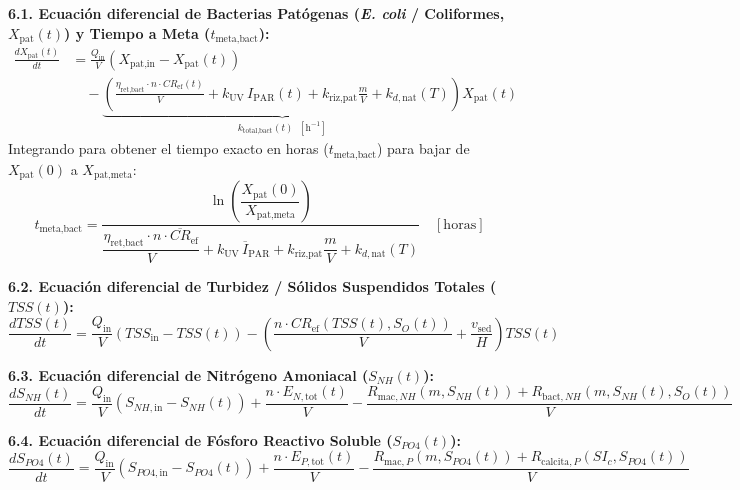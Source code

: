 \documentclass[11pt,letterpaper]{article}
\begin{document}
\begin{formulabox}
\textbf{6.1. Ecuación diferencial de Bacterias Patógenas (\textit{E. coli} / Coliformes, $X_{\text{pat}}(t)$) y Tiempo a Meta ($t_{\text{meta,bact}}$):}
\begin{equation}
\begin{aligned}
\frac{dX_{\text{pat}}(t)}{dt} &= \frac{Q_{\text{in}}}{V}\left(X_{\text{pat,in}} - X_{\text{pat}}(t)\right) \\
&\quad - \underbrace{\left(\frac{\eta_{\text{ret,bact}} \cdot n \cdot CR_{\text{ef}}(t)}{V} + k_{\text{UV}}\,I_{\text{PAR}}(t) + k_{\text{riz,pat}}\frac{m}{V} + k_{d,\text{nat}}(T)\right)}_{k_{\text{total,bact}}(t) \;\; [\text{h}^{-1}]} X_{\text{pat}}(t)
\end{aligned}
\label{eq:dxpat}
\end{equation}
Integrando para obtener el tiempo exacto en horas ($t_{\text{meta,bact}}$) para bajar de $X_{\text{pat}}(0)$ a $X_{\text{pat,meta}}$:
\begin{equation}
t_{\text{meta,bact}} = \frac{\ln\!\left(\dfrac{X_{\text{pat}}(0)}{X_{\text{pat,meta}}}\right)}{\dfrac{\eta_{\text{ret,bact}} \cdot n \cdot \overline{CR}_{\text{ef}}}{V} + k_{\text{UV}}\,\overline{I}_{\text{PAR}} + k_{\text{riz,pat}}\dfrac{m}{V} + k_{d,\text{nat}}(T)} \quad [\text{horas}]
\label{eq:tmetabact}
\end{equation}

\textbf{6.2. Ecuación diferencial de Turbidez / Sólidos Suspendidos Totales ($TSS(t)$):}
\begin{equation}
\frac{dTSS(t)}{dt} = \frac{Q_{\text{in}}}{V}\left(TSS_{\text{in}} - TSS(t)\right) - \left(\frac{n \cdot CR_{\text{ef}}\!\left(TSS(t), S_O(t)\right)}{V} + \frac{v_{\text{sed}}}{H}\right) TSS(t)
\label{eq:dtss}
\end{equation}

\textbf{6.3. Ecuación diferencial de Nitrógeno Amoniacal ($S_{NH}(t)$):}
\begin{equation}
\frac{dS_{NH}(t)}{dt} = \frac{Q_{\text{in}}}{V}\left(S_{NH,\text{in}} - S_{NH}(t)\right) + \frac{n \cdot E_{N,\text{tot}}(t)}{V} - \frac{R_{\text{mac},NH}\!\left(m, S_{NH}(t)\right) + R_{\text{bact},NH}\!\left(m, S_{NH}(t), S_O(t)\right)}{V}
\label{eq:dsnh}
\end{equation}

\textbf{6.4. Ecuación diferencial de Fósforo Reactivo Soluble ($S_{PO4}(t)$):}
\begin{equation}
\frac{dS_{PO4}(t)}{dt} = \frac{Q_{\text{in}}}{V}\left(S_{PO4,\text{in}} - S_{PO4}(t)\right) + \frac{n \cdot E_{P,\text{tot}}(t)}{V} - \frac{R_{\text{mac},P}\!\left(m, S_{PO4}(t)\right) + R_{\text{calcita},P}\!\left(SI_c, S_{PO4}(t)\right)}{V}
\label{eq:dspo4}
\end{equation}


\end{formulabox}
\end{document}
